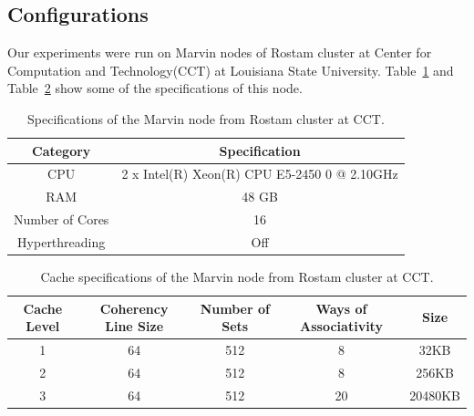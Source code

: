 \subsection{Configurations}
Our experiments were run on Marvin nodes of Rostam cluster at Center for Computation and Technology(CCT) at Louisiana State University. Table~\ref{table3} and Table~\ref{table4} show some of the specifications of this node.

\vspace{\baselineskip}	
\begin{table}[H]
	\centering
	\scalebox{0.75}
	{\begin{tabular}{|c | c |} 
			\hline

			Category & Specification\\
			\hline
			\hline
			CPU &  2 x Intel(R) Xeon(R) CPU E5-2450 0 @ 2.10GHz \\ [0.5ex] 
			\hline
			RAM & 48 GB\\ 	
			\hline
			Number of Cores & 16\\
			\hline	
			Hyperthreading & Off \\
			\hline			
	\end{tabular}}	
	\caption{Specifications of the Marvin node from Rostam cluster at CCT.}
	\label{table3}
\end{table} 


\vspace{\baselineskip}	
\begin{table}[H]
	\centering
	\scalebox{0.9}
	{\begin{tabular}{|c | c | c | c | c|} 
			\hline
			Cache Level &  Coherency Line Size & Number of Sets & Ways of Associativity & Size\\ [0.5ex] 
			\hline
			\hline
			1 & 64 & 512 & 8 & 32KB \\	
			\hline
			2 & 64 & 512 & 8 & 256KB \\
			\hline	
			3 & 64 & 512 & 20 & 20480KB \\
			\hline			
	\end{tabular}}	
	\caption{Cache specifications of the Marvin node from Rostam cluster at CCT.}
	\label{table4}
\end{table} 
\vspace{\baselineskip}	

